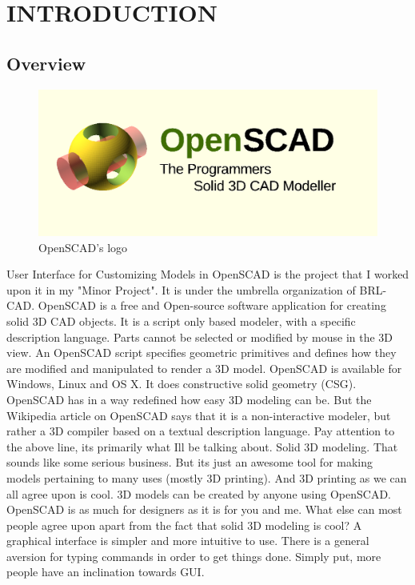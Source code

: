 \documentclass[12pt,includeheadfoot,a4paper]{report}
\begin{document}
	
	\begin{screen}
		\ppttitle
	\end{screen}
\thispagestyle{empty} 
\pagetitle
\newpage
{}
\cfoot{\thepage}


\newpage


\tableofcontents
\listoffigures
{}
\cfoot{\thepage}

\chapter{INTRODUCTION}
\section{Overview}
\begin{figure}[H] 
	\centering \includegraphics[scale=0.31]{images/openscad.png}
	\caption{OpenSCAD's logo}
	\label{fig:openscadlogo}
\end{figure}

User Interface for Customizing Models in OpenSCAD is the project that I worked upon it in my "Minor Project". It is under the umbrella organization of BRL-CAD. OpenSCAD is a free and Open-source software application for creating solid 3D CAD objects. It is a script only based
modeler, with a specific description language. Parts cannot be selected or modified by mouse
in the 3D view. An OpenSCAD script specifies geometric primitives and defines how they are
modified and manipulated to render a 3D model. OpenSCAD is available for Windows, Linux and
OS X. It does constructive solid geometry (CSG). OpenSCAD has in a way redefined how easy
3D modeling can be. But the Wikipedia article on OpenSCAD says that it is a non-interactive
modeler, but rather a 3D compiler based on a textual description language. Pay attention to the
above line, its primarily what Ill be talking about. Solid 3D modeling. That sounds like some
serious business. But its just an awesome tool for making models pertaining to many uses (mostly
3D printing). And 3D printing as we can all agree upon is cool. 3D models can be created by
anyone using OpenSCAD. OpenSCAD is as much for designers as it is for you and me. What
else can most people agree upon apart from the fact that solid 3D modeling is cool? A graphical
interface is simpler and more intuitive to use. There is a general aversion for typing commands in
order to get things done. Simply put, more people have an inclination towards GUI.
\end{document}
